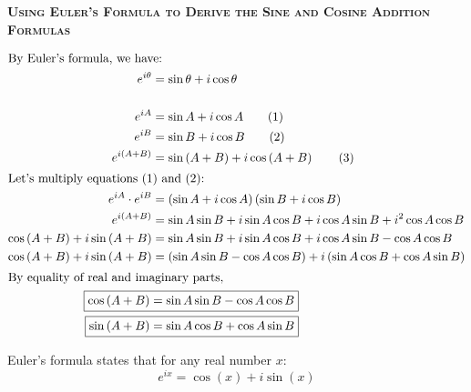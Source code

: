 \documentclass{article}
\begin{document}
\pagebreak
\begin{center}
    \textsc{\textbf{Using Euler's Formula to Derive the Sine and Cosine Addition Formulas}}
\end{center}

\begin{center}
\end{center}

\begin{align*}
    \intertext{By Euler's formula, we have:}
    e^{i\theta} &= \sin \theta + i\cos \theta\\[5mm]
    e^{iA} &= \sin A + i\cos A \tag{1}\\
    e^{iB} &= \sin B + i\cos B \tag{2}\\
    e^{i\left(A+B\right)} &= \sin\left(A+B\right) + i\cos\left(A+B\right) \tag{3}\\  
    \intertext{Let's multiply equations (1) and (2):}
    e^{iA} \cdot e^{iB} &= \left(\sin A + i\cos A\right)\left(\sin B + i\cos B\right)\\
    e^{i\left(A+B\right)} &= \sin A\sin B + i\sin A\cos B + i\cos A\sin B + i^2\cos A\cos B\\
    \cos\left(A+B\right) + i\sin\left(A+B\right) &= \sin A\sin B + i\sin A\cos B + i\cos A\sin B - \cos A\cos B\\
    \cos\left(A+B\right) + i\sin\left(A+B\right) &= \left(\sin A\sin B - \cos A\cos B\right) + i\left(\sin A\cos B + \cos A\sin B\right)\\
    \intertext{By equality of real and imaginary parts,}
    \Aboxed{\cos\left(A+B\right) &= \sin A\sin B - \cos A\cos B}\\
    \Aboxed{\sin\left(A+B\right) &= \sin A\cos B + \cos A\sin B}
\end{align*}






\pagebreak
Euler's formula states that for any real number \( x \):
\[
e^{ix} = \cos(x) + i\sin(x)
\]

\end{document}
